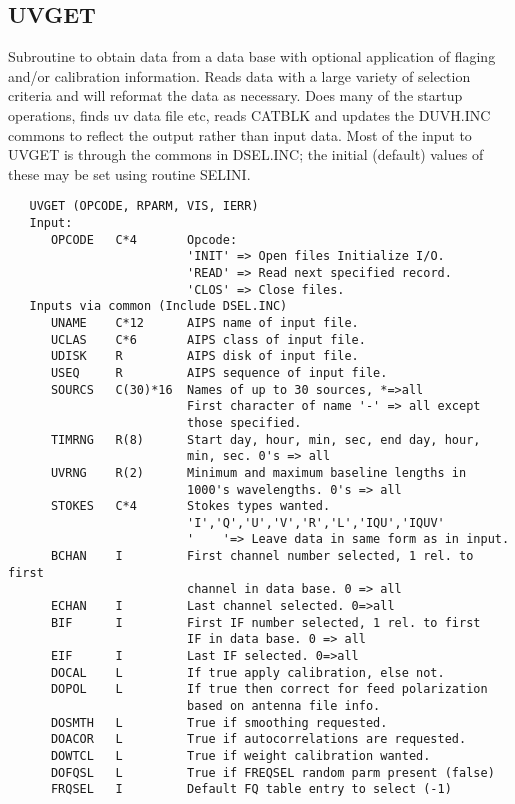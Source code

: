 \subsection{UVGET}
Subroutine to obtain data from a data base with optional application
of flaging and/or calibration information.  Reads data with a large
variety of selection criteria and will reformat the data as
necessary.  Does many of the startup operations, finds uv data file
etc, reads CATBLK and updates the DUVH.INC commons to reflect the
output rather than input data.
   Most of the input to UVGET is through the commons in DSEL.INC;
the initial (default) values of these may be set using routine
SELINI.
\begin{verbatim}
   UVGET (OPCODE, RPARM, VIS, IERR)
   Input:
      OPCODE   C*4       Opcode:
                         'INIT' => Open files Initialize I/O.
                         'READ' => Read next specified record.
                         'CLOS' => Close files.
   Inputs via common (Include DSEL.INC)
      UNAME    C*12      AIPS name of input file.
      UCLAS    C*6       AIPS class of input file.
      UDISK    R         AIPS disk of input file.
      USEQ     R         AIPS sequence of input file.
      SOURCS   C(30)*16  Names of up to 30 sources, *=>all
                         First character of name '-' => all except
                         those specified.
      TIMRNG   R(8)      Start day, hour, min, sec, end day, hour,
                         min, sec. 0's => all
      UVRNG    R(2)      Minimum and maximum baseline lengths in
                         1000's wavelengths. 0's => all
      STOKES   C*4       Stokes types wanted.
                         'I','Q','U','V','R','L','IQU','IQUV'
                         '    '=> Leave data in same form as in input.
      BCHAN    I         First channel number selected, 1 rel. to first
                         channel in data base. 0 => all
      ECHAN    I         Last channel selected. 0=>all
      BIF      I         First IF number selected, 1 rel. to first
                         IF in data base. 0 => all
      EIF      I         Last IF selected. 0=>all
      DOCAL    L         If true apply calibration, else not.
      DOPOL    L         If true then correct for feed polarization
                         based on antenna file info.
      DOSMTH   L         True if smoothing requested.
      DOACOR   L         True if autocorrelations are requested.
      DOWTCL   L         True if weight calibration wanted.
      DOFQSL   L         True if FREQSEL random parm present (false)
      FRQSEL   I         Default FQ table entry to select (-1)

\end{verbatim}
